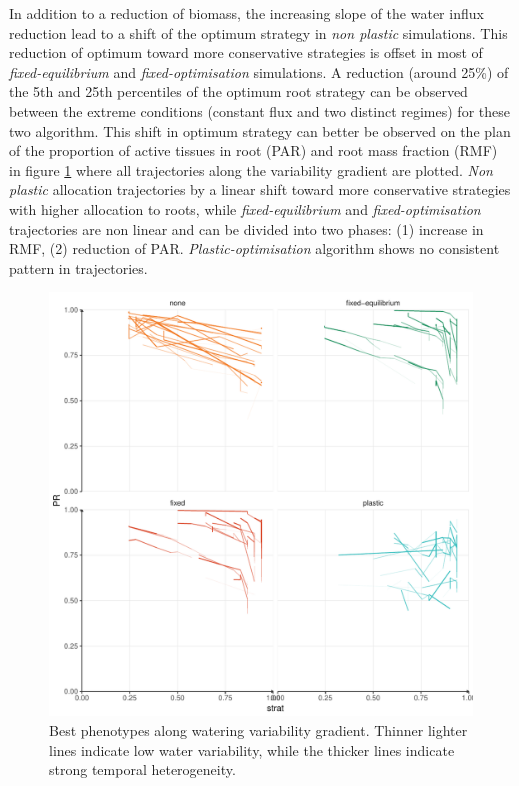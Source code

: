 In addition to a reduction of biomass, the increasing slope of the water influx reduction lead to a shift of the optimum strategy in \textit{non plastic} simulations. This reduction of optimum toward more conservative strategies is offset in most of \textit{fixed-equilibrium} and \textit{fixed-optimisation} simulations. A reduction	(around 25\%) of the 5th and 25th percentiles of the optimum root strategy can be observed between the extreme conditions (constant flux and two distinct regimes) for these two algorithm. This shift in optimum strategy can better be observed on the plan of the proportion of active tissues in root (PAR) and root mass fraction (RMF) in figure \ref{fig:variable_trajectories} where all trajectories along the variability gradient are plotted. \textit{Non plastic} allocation trajectories by a linear shift toward more conservative strategies with higher allocation to roots, while \textit{fixed-equilibrium} and \textit{fixed-optimisation} trajectories are non linear and can be divided into two phases: (1) increase in RMF, (2) reduction of PAR. \textit{Plastic-optimisation} algorithm shows no consistent pattern in trajectories.


\begin{figure}\label{fig:variable_trajectories}
\includegraphics[width = \textwidth]{./2_PP/Figures/Variable/var_2D_strat_dyn.pdf}
\caption{Best phenotypes along watering variability gradient. Thinner lighter lines indicate low water variability, while the thicker lines indicate strong temporal heterogeneity.}
\end{figure}


